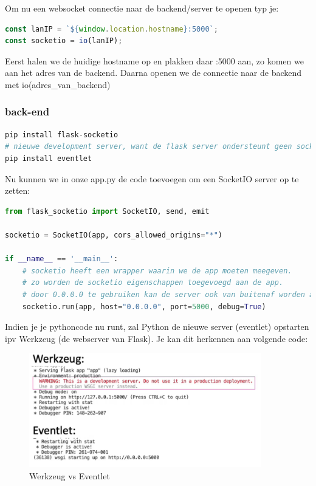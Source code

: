 \documentclass{article}
\begin{document}
Om nu een websocket connectie naar de backend/server te openen typ je: 
\begin{lstlisting}[language=Javascript]
const lanIP = `${window.location.hostname}:5000`;
const socketio = io(lanIP);
\end{lstlisting}

Eerst halen we de huidige hostname op en plakken daar :5000 aan, zo komen we aan het adres van de backend.
Daarna openen we de connectie naar de backend met io(adres\_van\_backend)


\subsubsection{back-end}
\begin{lstlisting}[language=Python]
pip install flask-socketio
# nieuwe development server, want de flask server ondersteunt geen sockets
pip install eventlet 
\end{lstlisting}

Nu kunnen we in onze app.py de code toevoegen om een SocketIO server op te zetten:

\begin{lstlisting}[language=Python]
from flask_socketio import SocketIO, send, emit

socketio = SocketIO(app, cors_allowed_origins="*")

if __name__ == '__main__':
    # socketio heeft een wrapper waarin we de app moeten meegeven.
    # zo worden de socketio eigenschappen toegevoegd aan de app.
    # door 0.0.0.0 te gebruiken kan de server ook van buitenaf worden aangesproken.
    socketio.run(app, host="0.0.0.0", port=5000, debug=True)
\end{lstlisting}

Indien je je pythoncode nu runt, zal Python de nieuwe server (eventlet) opstarten ipv Werkzeug (de webserver van Flask). 
Je kan dit herkennen aan volgende code:

\begin{figure}[H]
    \centering
    \includegraphics[width=0.9\textwidth]{img/Screenshot_20200420_085708.png} 
    \caption{Werkzeug vs Eventlet}   
\end{figure}
\end{document}
